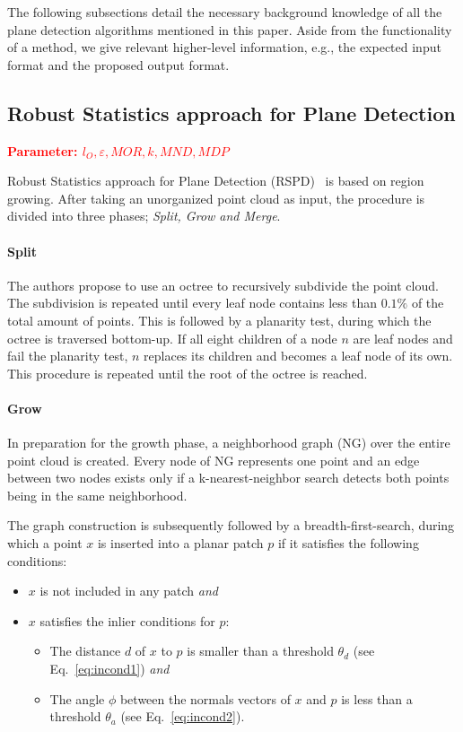 \documentclass[main.tex]{subfiles}
\begin{document}
The following subsections detail the necessary background knowledge of all the plane detection algorithms mentioned in this paper.
Aside from the functionality of a method, we give relevant higher-level information, e.g., the expected input format and the proposed output format.


\subsection{Robust Statistics approach for Plane Detection}
\label{subsec:bg-rspd}

\textbf{\textcolor{red}{Parameter: $l_O, \varepsilon, MOR, k, MND, MDP$}}

Robust Statistics approach for Plane Detection (RSPD)~\cite{Araújo_Oliveira_2020} is based on region growing. After taking an unorganized point cloud as input, the procedure is divided into three phases;
\textit{Split, Grow and Merge}.

\paragraph*{Split}
The authors propose to use an octree to recursively subdivide the point cloud. The subdivision is repeated until every leaf node contains less than $0.1\%$ of the total amount
of points.
This is followed by a planarity test, during which the octree is traversed bottom-up. If all eight children of a node $n$ are leaf nodes and fail the planarity test, $n$ replaces its children
and becomes a leaf node of its own. This procedure is repeated until the root of the octree is reached.

\paragraph*{Grow}
In preparation for the growth phase, a neighborhood graph (NG) over the entire point cloud is created. Every node of NG represents one point and an edge between two nodes exists only if
a k-nearest-neighbor search detects both points being in the same neighborhood.

The graph construction is subsequently followed by a breadth-first-search, during which a point $x$ is inserted into a planar patch $p$ if it satisfies the following conditions:
\begin{itemize}
    \item $x$ is not included in any patch \textit{and}
    \item $x$ satisfies the inlier conditions for $p$: %
          \begin{itemize}
              \item The distance $d$ of $x$ to $p$ is smaller than a threshold $\theta_d$ (see Eq.~\ref{eq:incond1}) \textit{and} %
              \item The angle $\phi$ between the normals vectors of $x$ and $p$ is less than a threshold $\theta_a$ (see Eq.~\ref{eq:incond2}). %
          \end{itemize}
\end{itemize}
\end{document}
